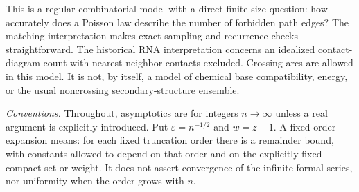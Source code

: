 \documentclass[11pt,letterpaper]{article}
\theoremstyle{remark}\newtheorem{remark}[theorem]{Remark}
\newcommand{\eps}{\varepsilon}\newcommand{\Pois}{\operatorname{Poisson}}
\begin{document}
This is a regular combinatorial model with a direct finite-size question: how accurately does a Poisson law describe the number of forbidden path edges? The matching interpretation makes exact sampling and recurrence checks straightforward. The historical RNA interpretation concerns an idealized contact-diagram count with nearest-neighbor contacts excluded. Crossing arcs are allowed in this model. It is not, by itself, a model of chemical base compatibility, energy, or the usual noncrossing secondary-structure ensemble.

\emph{Conventions.} Throughout, asymptotics are for integers $n\to\infty$ unless a real argument is explicitly introduced. Put $\eps=n^{-1/2}$ and $w=z-1$. A fixed-order expansion means: for each fixed truncation order there is a remainder bound, with constants allowed to depend on that order and on the explicitly fixed compact set or weight. It does not assert convergence of the infinite formal series, nor uniformity when the order grows with $n$.
\end{document}
